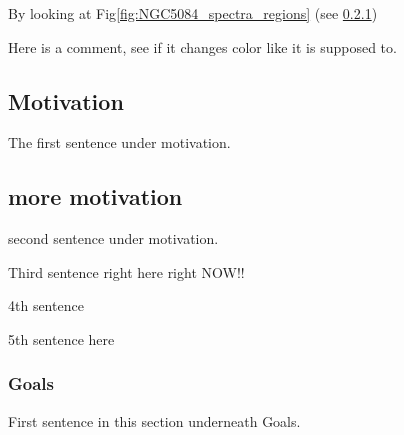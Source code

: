 \documentclass[modern]{CORE-AAS/aastex631}
\begin{document}
{By looking at Fig\ref{fig:NGC5084_spectra_regions} (see \ref{subsub:goals})

Here is a comment, see if it changes color like it is supposed to. 
\subsection{Motivation} %
\label{sub:motivation}

The first sentence under motivation. \citep{bernardi+2006aj131_1288}

\subsection{more motivation}
\label{sub:more_motivation}

second sentence under motivation.

Third sentence right here right NOW!! 


4th sentence

5th sentence here 

\subsubsection{Goals}
\label{subsub:goals}
First sentence in this section underneath Goals. 

}
\end{document}
